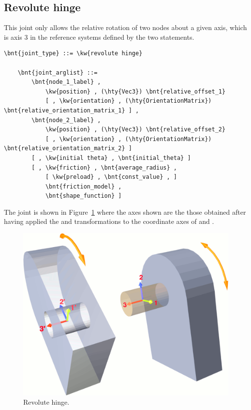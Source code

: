 \subsection{Revolute hinge}
\label{sec:EL:STRUCT:JOINT:REVOLUTE_HINGE}
This joint only allows the relative rotation of two nodes about
a given axis, which is axis 3 in the reference systems defined 
by the two  statements.
\begin{Verbatim}[commandchars=\\\{\}]
    \bnt{joint_type} ::= \kw{revolute hinge}

    \bnt{joint_arglist} ::= 
        \bnt{node_1_label} ,
            \kw{position} , (\hty{Vec3}) \bnt{relative_offset_1}
            [ , \kw{orientation} , (\hty{OrientationMatrix}) \bnt{relative_orientation_matrix_1} ] ,
        \bnt{node_2_label} ,
            \kw{position} , (\hty{Vec3}) \bnt{relative_offset_2}
            [ , \kw{orientation} , (\hty{OrientationMatrix}) \bnt{relative_orientation_matrix_2} ]
        [ , \kw{initial theta} , \bnt{initial_theta} ]
        [ , \kw{friction} , \bnt{average_radius} , 
            [ \kw{preload} , \bnt{const_value} , ]
            \bnt{friction_model} , 
            \bnt{shape_function} ]
\end{Verbatim}
The joint is shown in Figure~\ref{fig:el:joint:REV} where the axes shown are the those obtained after having applied the  and  transformations to the coordinate axes of  and .
\begin{figure}
\centering
\includegraphics[width=.7\textwidth]{revHinge}
\caption{Revolute hinge.}
\label{fig:el:joint:REV}
\end{figure}


